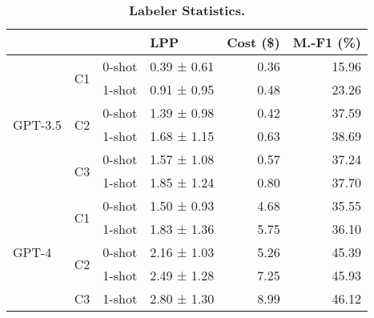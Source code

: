 \begin{table}[!ht]
\centering
\caption{\textbf{Labeler Statistics.}}
\label{tab:labeler-results}
\begin{tabular}{llllrr}
\toprule
 &  &  & LPP & Cost (\$) & M.-F1 (\%) \\
\midrule
\multirow[c]{6}{*}{GPT-3.5} & \multirow[c]{2}{*}{C1} & 0-shot & 0.39 ± 0.61 & 0.36 & 15.96 \\
 &  & 1-shot & 0.91 ± 0.95 & 0.48 & 23.26 \\
\cline{2-6}
 & \multirow[c]{2}{*}{C2} & 0-shot & 1.39 ± 0.98 & 0.42 & 37.59 \\
 &  & 1-shot & 1.68 ± 1.15 & 0.63 & 38.69 \\
\cline{2-6}
 & \multirow[c]{2}{*}{C3} & 0-shot & 1.57 ± 1.08 & 0.57 & 37.24 \\
 &  & 1-shot & 1.85 ± 1.24 & 0.80 & 37.70 \\
\cline{1-6} \cline{2-6}
\multirow[c]{5}{*}{GPT-4} & \multirow[c]{2}{*}{C1} & 0-shot & 1.50 ± 0.93 & 4.68 & 35.55 \\
 &  & 1-shot & 1.83 ± 1.36 & 5.75 & 36.10 \\
\cline{2-6}
 & \multirow[c]{2}{*}{C2} & 0-shot & 2.16 ± 1.03 & 5.26 & 45.39 \\
 &  & 1-shot & 2.49 ± 1.28 & 7.25 & 45.93 \\
\cline{2-6}
 & C3 & 1-shot & 2.80 ± 1.30 & 8.99 & 46.12 \\
\cline{1-6} \cline{2-6}
\bottomrule
\end{tabular}
\end{table}
